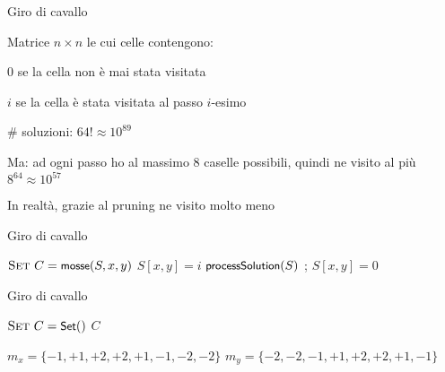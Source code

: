 \begin{frame}{Giro di cavallo}
	

\BIL
\item  Matrice $n \times n$ le cui celle contengono: 
	\BI
  \item $0$	\qquad	se la cella non è mai stata visitata
  \item $i$	\qquad		se la cella è stata visitata al passo $i$-esimo
	\EI
\item \# soluzioni: $64! \approx 10^{89}$
\item Ma: ad ogni passo ho al massimo $8$ caselle possibili, quindi ne visito al più $8^{64} \approx 10^{57}$
\item In realtà, grazie al pruning ne visito molto meno	
\EIL
\end{frame}

\begin{frame}{Giro di cavallo}
	
\begin{Procedure}
\caption[A]{\BOOLEAN {}($\INTEGER[\,][\,]\ S$, \INTEGER $i$, \INTEGER $x$, \INTEGER $y$)}
$\textsc{Set}\ C = \textsf{{\small mosse}}(S, x, y)$\;
{
  $S[x,y] = i$\;
  {
    $\textsf{{\small processSolution}}(S)$\;
    \Return \TRUE\;
  }
  {
     \Return \TRUE;
  }
  $S[x,y] = 0$\;
}
\Return \FALSE\;
\end{Procedure}

\end{frame}

\begin{frame}{Giro di cavallo}

\begin{Procedure}
\caption[A]{\Set {}($\INTEGER[\,][\,]\ S$, \INTEGER $x$, \INTEGER $y$)}
$\textsc{Set}\ C = \textsf{{\small Set}}()$\;
\Return $C$\;
\end{Procedure}

\begin{Procedure}
	$m_x = \{ -1, +1, +2, +2, +1, -1, -2, -2 \}$\;
	$m_y = \{ -2, -2, -1, +1, +2, +2, +1, -1 \}$\;
\end{Procedure}

\end{frame}

